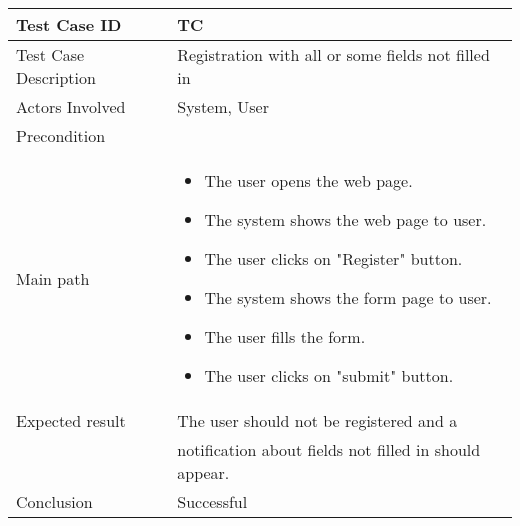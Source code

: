 \begin{center} \begin{tabular}{|l|l|}
  \hline
  Test Case ID & TC \z\\
  \hline
  Test Case Description & Registration with all or some fields not filled in\\
  \hline
  Actors Involved & System, User\\
   \hline
  Precondition & \\
  \hline
  Main path &   \begin{minipage}{5in}
    \vskip 4pt
            \begin{itemize}
              \item The user opens the web page.
              \item The system shows the web page to user.
              \item The user clicks on "Register" button.
              \item The system shows the form page to user.
              \item The user fills the form.
              \item The user clicks on "submit" button.
            \end{itemize}
    \vskip 4pt
  \end{minipage}  \\
  \hline
  Expected result & The user should not be registered and a\\
     & notification about fields not filled in should appear.\\
  \hline
  Conclusion & Successful\\
  \hline
\end{tabular} \end{center}


